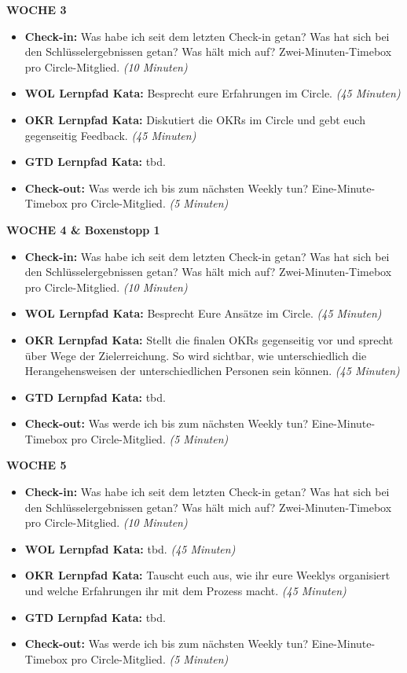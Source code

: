 \documentclass[
  ngerman,
  paper=a4,
,captions=tableheading
]{scrartcl}
\providecommand{\tightlist}{%
  \setlength{\itemsep}{0pt}\setlength{\parskip}{0pt}}
\begin{document}
\textbf{WOCHE 3}

\begin{itemize}
\tightlist
\item
  \textbf{Check-in:} Was habe ich seit dem letzten Check-in getan? Was
  hat sich bei den Schlüsselergebnissen getan? Was hält mich auf?
  Zwei-Minuten-Timebox pro Circle-Mitglied. \emph{(10 Minuten)}
\item
  \textbf{WOL Lernpfad Kata:} Besprecht eure Erfahrungen im Circle.
  \emph{(45 Minuten)}
\item
  \textbf{OKR Lernpfad Kata:} Diskutiert die OKRs im Circle und gebt
  euch gegenseitig Feedback. \emph{(45 Minuten)}
\item
  \textbf{GTD Lernpfad Kata:} tbd.
\item
  \textbf{Check-out:} Was werde ich bis zum nächsten Weekly tun?
  Eine-Minute-Timebox pro Circle-Mitglied. \emph{(5 Minuten)}
\end{itemize}

\textbf{WOCHE 4 \& Boxenstopp 1}

\begin{itemize}
\tightlist
\item
  \textbf{Check-in:} Was habe ich seit dem letzten Check-in getan? Was
  hat sich bei den Schlüsselergebnissen getan? Was hält mich auf?
  Zwei-Minuten-Timebox pro Circle-Mitglied. \emph{(10 Minuten)}
\item
  \textbf{WOL Lernpfad Kata:} Besprecht Eure Ansätze im Circle.
  \emph{(45 Minuten)}
\item
  \textbf{OKR Lernpfad Kata:} Stellt die finalen OKRs gegenseitig vor
  und sprecht über Wege der Zielerreichung. So wird sichtbar, wie
  unterschiedlich die Herangehensweisen der unterschiedlichen Personen
  sein können. \emph{(45 Minuten)}
\item
  \textbf{GTD Lernpfad Kata:} tbd.
\item
  \textbf{Check-out:} Was werde ich bis zum nächsten Weekly tun?
  Eine-Minute-Timebox pro Circle-Mitglied. \emph{(5 Minuten)}
\end{itemize}

\textbf{WOCHE 5}

\begin{itemize}
\tightlist
\item
  \textbf{Check-in:} Was habe ich seit dem letzten Check-in getan? Was
  hat sich bei den Schlüsselergebnissen getan? Was hält mich auf?
  Zwei-Minuten-Timebox pro Circle-Mitglied. \emph{(10 Minuten)}
\item
  \textbf{WOL Lernpfad Kata:} tbd. \emph{(45 Minuten)}
\item
  \textbf{OKR Lernpfad Kata:} Tauscht euch aus, wie ihr eure Weeklys
  organisiert und welche Erfahrungen ihr mit dem Prozess macht.
  \emph{(45 Minuten)}
\item
  \textbf{GTD Lernpfad Kata:} tbd.
\item
  \textbf{Check-out:} Was werde ich bis zum nächsten Weekly tun?
  Eine-Minute-Timebox pro Circle-Mitglied. \emph{(5 Minuten)}
\end{itemize}
\end{document}
